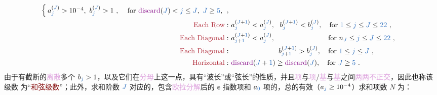 \begin{subequations}
\begin{align}
\begin{cases}
			a_{\textcolor{NavyBlue}{j}}^{(\textcolor{NavyBlue}{J})} > 10^{-4},\ b_{\textcolor{NavyBlue}{j}}^{(\textcolor{NavyBlue}{J})}>1~, &~ \text{for } \text{\textcolor{Plum}{discard}}(\textcolor{NavyBlue}{J}) < \textcolor{NavyBlue}{j} \le \textcolor{NavyBlue}{J},\ \textcolor{NavyBlue}{J} \ge\textcolor{NavyBlue}{5},
		\end{cases}\label{eq:chord:abj-relations-d}~,\\
		\text{\textcolor{Maroon}{Each Row}}: &~a_{\textcolor{NavyBlue}{j}}^{(\textcolor{NavyBlue}{J}+\textcolor{NavyBlue}{1})} < a_{\textcolor{NavyBlue}{j}}^{(\textcolor{NavyBlue}{J})},~~ b_{\textcolor{NavyBlue}{j}}^{(\textcolor{NavyBlue}{J}+\textcolor{NavyBlue}{1})} < b_{\textcolor{NavyBlue}{j}}^{(\textcolor{NavyBlue}{J})},\quad \text{for } \textcolor{NavyBlue}{1} \le \textcolor{NavyBlue}{j}\le \textcolor{NavyBlue}{J}\le \textcolor{NavyBlue}{22} \label{eq:chord:abj-relations-e}~,\\
		\text{\textcolor{Maroon}{Each Diagonal}}: &~a_{\textcolor{NavyBlue}{j}+\textcolor{NavyBlue}{1}}^{(\textcolor{NavyBlue}{J}+\textcolor{NavyBlue}{1})} < a_{\textcolor{NavyBlue}{j}}^{(\textcolor{NavyBlue}{J})},\hphantom{~~ b_{\textcolor{NavyBlue}{j}+\textcolor{NavyBlue}{1}}^{(\textcolor{NavyBlue}{J}+\textcolor{NavyBlue}{1})} > b_{\textcolor{NavyBlue}{j}}^{(\textcolor{NavyBlue}{J})},}\quad \text{for } n_{\textcolor{NavyBlue}{J}} \le \textcolor{NavyBlue}{j}\le \textcolor{NavyBlue}{J}\le \textcolor{NavyBlue}{22} \label{eq:chord:abj-relations-f}~,\\
		\text{\textcolor{Maroon}{Each Diagonal}}: &~\hphantom{a_{\textcolor{NavyBlue}{j}+\textcolor{NavyBlue}{1}}^{(\textcolor{NavyBlue}{J}+\textcolor{NavyBlue}{1})} < a_{\textcolor{NavyBlue}{j}}^{(\textcolor{NavyBlue}{J})},}~~ b_{\textcolor{NavyBlue}{j}+\textcolor{NavyBlue}{1}}^{(\textcolor{NavyBlue}{J}+\textcolor{NavyBlue}{1})} > b_{\textcolor{NavyBlue}{j}}^{(\textcolor{NavyBlue}{J})},\quad \text{for } \textcolor{NavyBlue}{1} \le \textcolor{NavyBlue}{j}\le \textcolor{NavyBlue}{J} \label{eq:chord:abj-relations-g}~,\\
		\text{\textcolor{Maroon}{Horizontal}}: &~\text{\textcolor{Plum}{discard}}(\textcolor{NavyBlue}{J}+\textcolor{NavyBlue}{1})\ge \text{\textcolor{Plum}{discard}}(\textcolor{NavyBlue}{J}),\quad \text{for } \textcolor{NavyBlue}{J} \ge \textcolor{NavyBlue}{5} \label{eq:chord:abj-relations-h}~.
	\end{align}
\end{subequations}
由于有截断的\textcolor{Plum}{离散}多个 $b_{\textcolor{NavyBlue}{j}} > 1$，以及它们在\textcolor{Plum}{分母}上这一点，具有“\textcolor{NavyBlue}{波长}”或“\textcolor{NavyBlue}{弦长}”的性质，并且\textcolor{Plum}{项}与\textcolor{Plum}{项}/\textcolor{Plum}{基}与\textcolor{Plum}{基}之间\textcolor{Plum}{两两不正交}，因此也称该级数  为“\textcolor{Maroon}{和弦级数}”；此外，求和阶数 ${\textcolor{NavyBlue}{J}}$ 对应的，包含\textcolor{Plum}{欧拉分解}后的 $\mathbb{e}$ 指数项和 $a_{\textcolor{NavyBlue}{0}}$ 项的，总的有效（$ a_{\textcolor{NavyBlue}{j}} \geq 10^{-4} $）求和项数 $N$ 为：
